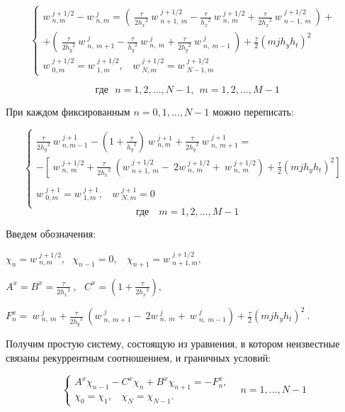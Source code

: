 \documentclass[a4paper]{article}
\begin{document}
\begin{equation}
\begin{cases}
w~^{j+1/2}_{n,m} - w~^j_{n,m} = (~\frac{\tau}{2{h_x}^2} ~w~^{j+1/2}_{n+1, ~m}-\frac{\tau}{{h_x}^2} ~w~^{j+1/2}_{n, ~m}+\frac{\tau}{2{h_x}^2} ~w~^{j+1/2}_{n-1, ~m}~)+\\+(~\frac{\tau}{2{h_y}^2} ~w~^{j}_{n, ~m+1}-\frac{\tau}{{h_y}^2} ~w~^{j}_{n, ~m}+\frac{\tau}{2{h_y}^2} ~w~^{j}_{n, ~m-1}~)+\frac{\tau}{2}(m j h_y h_t)^2 \\
w~^{j+1/2}_{0,m} = w~^{j+1/2}_{1,m},~~~~w~^{j+1/2}_{N,m} = w~^{j+1/2}_{N-1,m}
\end{cases}
\end{equation}
 
$$
\text{~~где~~} n = 1,2, ...,N-1, ~~ m=1,2,...,M-1
$$

При каждом фиксированным $n=0,1,...,N-1$ можно переписать:

\begin{equation}
\begin{cases}
\frac{\tau}{2{h_y}^2} ~w~^{j+1}_{n,m-1} - \left(1+\frac{\tau}{{h_y}^2}\right) ~w~^{j+1}_{n,m} + \frac{\tau}{2{h_y}^2} ~w~^{j+1}_{n, ~m+1}=\\-\left[~w~^{j+1/2}_{n, ~m} + \frac{\tau}{2{h_x}^2} ~\left(w~^{j+1/2}_{n+1, ~m}-~2w~^{j+1/2}_{n, ~m}+~w~^{j+1/2}_{n, ~m}\right)+\frac{\tau}{2}(m j h_y h_t)^2 \right]\\ 
\\w~^{j+1}_{0,m} = w~^{j+1}_{1,m},~~~~w~^{j+1}_{N,m} = 0\\
\end{cases}
\end{equation}
$$
\text{~~где~~~} m=1,2,...,M-1
$$

Введем обозначения:

$\chi_n = w~^{j+1/2}_{n,m}, ~~~\chi_{n-1} = 0, ~~~\ \chi_{n+1}=w~^{j+1/2}_{n+1,m},$

$A^x=B^x=\frac{\tau}{2{h_x}^2}~, ~~~C^x=\left(1+\frac{\tau}{2{h_x}^2}\right),$

$F^x_n=~w~^{j}_{n, ~m} + \frac{\tau}{2{h_y}^2} ~\left(w~^{j}_{n, ~m+1}-~2w~^{j}_{n, ~m}+~w~^{j}_{n, ~m-1}\right)+\frac{\tau}{2}(m j h_y h_t)^2~.$

Получим простую систему, состоящую из уравнения, в котором неизвестные связаны рекуррентным соотношением, и граничных условий:

\begin{equation}
\begin{cases}
A^x \chi_{n-1} - C^x \chi_n +B^x \chi_{n+1} = -F^x_n,\\
\chi_0=\chi_1,~~~~\chi_N=\chi_{N-1}.
\end{cases}~~~~n=1,...,N-1
\end{equation}
\end{document}
